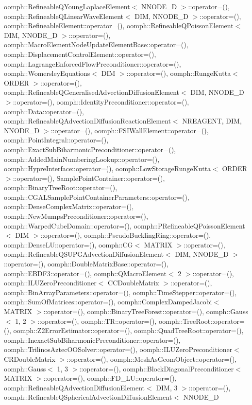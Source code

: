 oomph\+::\+Refineable\+Q\+Young\+Laplace\+Element$<$ N\+N\+O\+D\+E\+\_\+D $>$\+::operator=(), oomph\+::\+Refineable\+Q\+Linear\+Wave\+Element$<$ D\+I\+M, N\+N\+O\+D\+E\+\_\+D $>$\+::operator=(), oomph\+::\+Refineable\+Element\+::operator=(), oomph\+::\+Refineable\+Q\+Poisson\+Element$<$ D\+I\+M, N\+N\+O\+D\+E\+\_\+D $>$\+::operator=(), oomph\+::\+Macro\+Element\+Node\+Update\+Element\+Base\+::operator=(), oomph\+::\+Displacement\+Control\+Element\+::operator=(), oomph\+::\+Lagrange\+Enforced\+Flow\+Preconditioner\+::operator=(), oomph\+::\+Womersley\+Equations$<$ D\+I\+M $>$\+::operator=(), oomph\+::\+Runge\+Kutta$<$ O\+R\+D\+E\+R $>$\+::operator=(), oomph\+::\+Refineable\+Q\+Generalised\+Advection\+Diffusion\+Element$<$ D\+I\+M, N\+N\+O\+D\+E\+\_\+D $>$\+::operator=(), oomph\+::\+Identity\+Preconditioner\+::operator=(), oomph\+::\+Data\+::operator=(), oomph\+::\+Refineable\+Q\+Advection\+Diffusion\+Reaction\+Element$<$ N\+R\+E\+A\+G\+E\+N\+T, D\+I\+M, N\+N\+O\+D\+E\+\_\+D $>$\+::operator=(), oomph\+::\+F\+S\+I\+Wall\+Element\+::operator=(), oomph\+::\+Point\+Integral\+::operator=(), oomph\+::\+Exact\+Sub\+Biharmonic\+Preconditioner\+::operator=(), oomph\+::\+Added\+Main\+Numbering\+Lookup\+::operator=(), oomph\+::\+Hypre\+Interface\+::operator=(), oomph\+::\+Low\+Storage\+Runge\+Kutta$<$ O\+R\+D\+E\+R $>$\+::operator=(), Sample\+Point\+Container\+::operator=(), oomph\+::\+Binary\+Tree\+Root\+::operator=(), oomph\+::\+C\+G\+A\+L\+Sample\+Point\+Container\+Parameters\+::operator=(), oomph\+::\+Dense\+Complex\+Matrix\+::operator=(), oomph\+::\+New\+Mumps\+Preconditioner\+::operator=(), oomph\+::\+Warped\+Cube\+Domain\+::operator=(), oomph\+::\+P\+Refineable\+Q\+Poisson\+Element$<$ D\+I\+M $>$\+::operator=(), oomph\+::\+Pseudo\+Buckling\+Ring\+::operator=(), oomph\+::\+Dense\+L\+U\+::operator=(), oomph\+::\+C\+G$<$ M\+A\+T\+R\+I\+X $>$\+::operator=(), oomph\+::\+Refineable\+Q\+S\+U\+P\+G\+Advection\+Diffusion\+Element$<$ D\+I\+M, N\+N\+O\+D\+E\+\_\+D $>$\+::operator=(), oomph\+::\+Double\+Matrix\+Base\+::operator=(), oomph\+::\+E\+B\+D\+F3\+::operator=(), oomph\+::\+Q\+Macro\+Element$<$ 2 $>$\+::operator=(), oomph\+::\+I\+L\+U\+Zero\+Preconditioner$<$ C\+C\+Double\+Matrix $>$\+::operator=(), oomph\+::\+Bin\+Array\+Parameters\+::operator=(), oomph\+::\+Time\+Stepper\+::operator=(), oomph\+::\+Sum\+Of\+Matrices\+::operator=(), oomph\+::\+Complex\+Damped\+Jacobi$<$ M\+A\+T\+R\+I\+X $>$\+::operator=(), oomph\+::\+Binary\+Tree\+Forest\+::operator=(), oomph\+::\+Gauss$<$ 1, 2 $>$\+::operator=(), oomph\+::\+T\+R\+::operator=(), oomph\+::\+Tree\+Root\+::operator=(), oomph\+::\+Z2\+Error\+Estimator\+::operator=(), oomph\+::\+Quad\+Tree\+Root\+::operator=(), oomph\+::\+Inexact\+Sub\+Biharmonic\+Preconditioner\+::operator=(), oomph\+::\+Trilinos\+Aztec\+O\+O\+Solver\+::operator=(), oomph\+::\+I\+L\+U\+Zero\+Preconditioner$<$ C\+R\+Double\+Matrix $>$\+::operator=(), oomph\+::\+Mesh\+As\+Geom\+Object\+::operator=(), oomph\+::\+Gauss$<$ 1, 3 $>$\+::operator=(), oomph\+::\+Block\+Diagonal\+Preconditioner$<$ M\+A\+T\+R\+I\+X $>$\+::operator=(), oomph\+::\+F\+D\+\_\+\+L\+U\+::operator=(), oomph\+::\+Refineable\+Q\+Advection\+Diffusion\+Element$<$ D\+I\+M, 3 $>$\+::operator=(), oomph\+::\+Refineable\+Q\+Spherical\+Advection\+Diffusion\+Element$<$ N\+N\+O\+D\+E\+\_\+D 